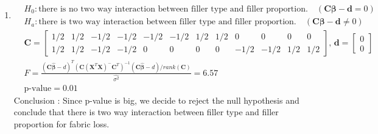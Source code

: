 \documentclass{article}
\begin{document}
\begin{enumerate}[leftmargin = 0 em, label = \arabic*., font = \bfseries]
\begin{enumerate}
		\item 
		\begin{align*}
		&H_0 : \textrm{there is no two way interaction between filler type and filler proportion.} \quad (\bm C \bm \beta - \bm d = 0)\\
		&H_a : \textrm{there is two way interaction between filler type and filler proportion.} \quad (\bm C \bm \beta -\bm d \neq 0)
		\end{align*}
		\begin{align*}
		& \bm C = \begin{bmatrix}
			1/2&1/2&-1/2&-1/2&-1/2&-1/2&1/2&1/2&0&0&0&0\\
			1/2&1/2&-1/2&-1/2&0&0&0&0&-1/2&-1/2&1/2&1/2
		\end{bmatrix},\, \bm d = \begin{bmatrix}
			0\\0
		\end{bmatrix}\\
		&  F = \frac{(\bm C \hat{\bm \beta} - d)^T (\bm C (\bm X^T \bm X)^-\bm C^T)^{-1} (\bm C \bm \hat{\bm\beta} - d)/rank(\bm C)}{\hat{\sigma^2}} = 6.57\\
		& \textrm{p-value} = 0.01
		\end{align*}
		Conclusion : Since p-value is big, we decide to reject the null hypothesis and conclude that there is two way interaction between filler type and filler proportion for fabric loss. 

		
		


	\end{enumerate}
	
	


 	\end{enumerate}


	
	
	
	
\end{document}
